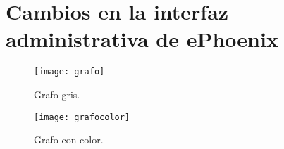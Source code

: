 \chapter{Cambios en la interfaz administrativa de ePhoenix}
\label{apendiceA}


\begin{figure}[h!]
\centering
\texttt{[image: grafo]}
\caption[Grafo]{Grafo gris.}
\label{imagen:grafo}
\end{figure}

\begin{figure}[h!]
\centering
\texttt{[image: grafocolor]}
\caption[Grafo coloreado (esto sale en la tabla de contenidos)]{Grafo con color.}
\label{imagen:grafodecolores}
\end{figure}
